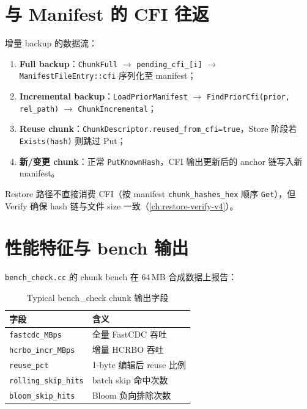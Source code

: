 \section{与 Manifest 的 CFI 往返}
\label{sec:hcrbo-manifest}

增量 backup 的数据流：

\begin{enumerate}[nosep]
  \item \textbf{Full backup}：\texttt{ChunkFull} $\rightarrow$ \texttt{pending\_cfi\_[i]} $\rightarrow$ \texttt{ManifestFileEntry::cfi} 序列化至 manifest；
  \item \textbf{Incremental backup}：\texttt{LoadPriorManifest} $\rightarrow$ \texttt{FindPriorCfi(prior, rel\_path)} $\rightarrow$ \texttt{ChunkIncremental}；
  \item \textbf{Reuse chunk}：\texttt{ChunkDescriptor.reused\_from\_cfi=true}，Store 阶段若 \texttt{Exists(hash)} 则跳过 Put；
  \item \textbf{新/变更 chunk}：正常 \texttt{PutKnownHash}，CFI 输出更新后的 anchor 链写入新 manifest。
\end{enumerate}

Restore 路径不直接消费 CFI（按 manifest \texttt{chunk\_hashes\_hex} 顺序 \texttt{Get}），但 Verify 确保 hash 链与文件 size 一致（\cref{ch:restore-verify-v4}）。

\section{性能特征与 bench 输出}
\label{sec:hcrbo-perf}

\texttt{bench\_check.cc} 的 chunk bench 在 64\,MB 合成数据上报告：

\begin{table}[htbp]
\centering
\caption{Typical bench\_check chunk 输出字段}
\label{tab:bench-chunk-output}
\begin{tabular}{@{}ll@{}}
\toprule
字段 & 含义 \\
\midrule
\texttt{fastcdc\_MBps} & 全量 FastCDC 吞吐 \\
\texttt{hcrbo\_incr\_MBps} & 增量 HCRBO 吞吐 \\
\texttt{reuse\_pct} & 1-byte 编辑后 reuse 比例 \\
\texttt{rolling\_skip\_hits} & batch skip 命中次数 \\
\texttt{bloom\_skip\_hits} & Bloom 负向排除次数 \\
\bottomrule
\end{tabular}
\end{table}


